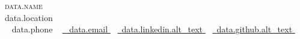 \documentclass[a4paper,11pt]{article}
\begin{document}
\begin{center}

{\Huge \scshape {{ data.name }} } \\ \vspace{2pt}
{{ data.location }}\\ \vspace{2pt}
\small \raisebox{-0.1\height}\faPhone\ {{ data.phone }} ~ \href{mailto:{{ data.email }}}{\raisebox{-0.2\height}\faEnvelope\  {{ data.email }}} ~
\href{ {{-data.linkedin.link-}} }{\raisebox{-0.2\height}\faLinkedin\ {{data.linkedin.alt_text}} }  ~
\href{ {{-data.github.link-}} }{\raisebox{-0.2\height}\faGithub\ {{data.github.alt_text}} } ~

\end{center}
\end{document}
